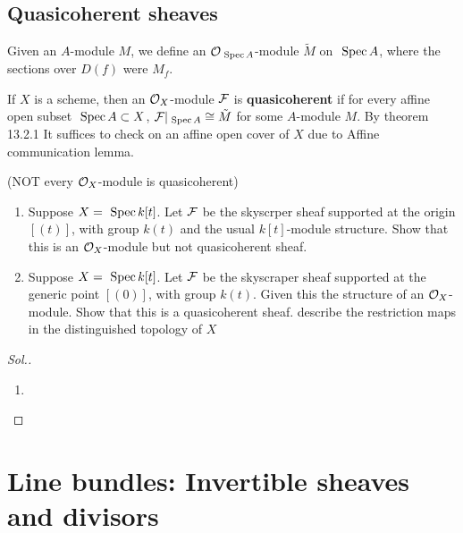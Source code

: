 \documentclass[11pt]{book} %
\begin{document}
\section{Quasicoherent sheaves}
Given an $A$-module $M$, we define an ${\cal O}_{\text{ Spec\,} A}$-module $\tilde{M}$ on $\text{ Spec\,} A$, where the sections over $D(f)$ were $M_f$.
\begin{definition}
If $X$ is a scheme, then an ${\cal O}_X$-module ${\cal F}$ is \textbf{quasicoherent} if for every affine open subset $\text{ Spec\,} A\subset X$, ${\cal F}|_{\text{ Spec\,} A}\cong\tilde{M}$ for some $A$-module $M$. By theorem 13.2.1 It suffices to check on an affine open cover of $X$ due to Affine communication lemma.
\end{definition}
\begin{exr}
(NOT every ${\cal O}_X$-module is quasicoherent)
\begin{enumerate}[label=(\alph*)]
\item Suppose $X=\text{ Spec\,} k[t]$. Let ${\cal F}$ be the skyscrper sheaf supported at the origin $[(t)]$, with group $k(t)$ and the usual $k[t]$-module structure. Show that this is an ${\cal O}_X$-module  but not quasicoherent sheaf.
\item Suppose $X=\text{ Spec\,} k[t]$. Let ${\cal F}$ be the skyscraper sheaf supported at the generic point $[(0)]$, with group $k(t)$. Given this the structure of an ${\cal O}_X$-module. Show that this is a quasicoherent sheaf. describe the restriction maps in the distinguished topology of $X$
\end{enumerate}
\end{exr}
\begin{proof}[Sol.]
\begin{enumerate}[label=(\alph*)]
\item 
\end{enumerate}
\end{proof}
\chapter{Line bundles: Invertible sheaves and divisors}
\end{document}
